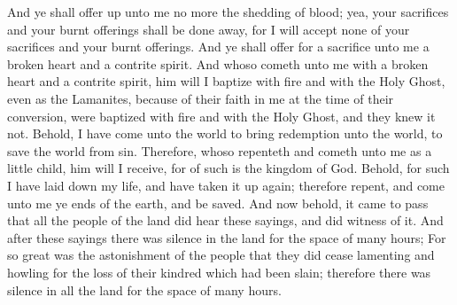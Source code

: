 And ye shall offer up unto me no more the shedding of blood; yea, your sacrifices and your burnt offerings shall be done away, for I will accept none of your sacrifices and your burnt offerings.
\bverse \iffalse And ye shall offer for a sacrifice unto me a broken heart and a contrite spirit. And whoso cometh unto me with a broken heart and a contrite spirit, him will I baptize with fire and with the Holy Ghost, even as the Lamanites, because of their faith in me at the time of their conversion, were baptized with fire and with the Holy Ghost, and they knew it not. \fi
And ye shall offer for a sacrifice unto me a broken heart and a contrite spirit. And whoso cometh unto me with a broken heart and a contrite spirit, him will I baptize with fire and with the Holy Ghost, even as the Lamanites, because of their faith in me at the time of their conversion, were baptized with fire and with the Holy Ghost, and they knew it not.
\bverse \iffalse Behold, I have come unto the world to bring redemption unto the world, to save the world from sin. \fi
Behold, I have come unto the world to bring redemption unto the world, to save the world from sin.
\bverse \iffalse Therefore, whoso repenteth and cometh unto me as a little child, him will I receive, for of such is the kingdom of God.  Behold, for such I have laid down my life, and have taken it up again; therefore repent, and come unto me ye ends of the earth, and be saved. \fi
Therefore, whoso repenteth and cometh unto me as a little child, him will I receive, for of such is the kingdom of God.  Behold, for such I have laid down my life, and have taken it up again; therefore repent, and come unto me ye ends of the earth, and be saved.
\bchapter
\bverse \iffalse And now behold, it came to pass that all the people of the land did hear these sayings, and did witness of it. And after these sayings there was silence in the land for the space of many hours; \fi
And now behold, it came to pass that all the people of the land did hear these sayings, and did witness of it. And after these sayings there was silence in the land for the space of many hours;
\bverse \iffalse For so great was the astonishment of the people that they did cease lamenting and howling for the loss of their kindred which had been slain; therefore there was silence in all the land for the space of many hours. \fi
For so great was the astonishment of the people that they did cease lamenting and howling for the loss of their kindred which had been slain; therefore there was silence in all the land for the space of many hours.
